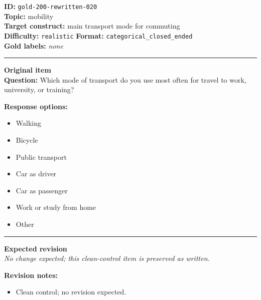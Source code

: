 \documentclass[10pt,a4paper]{article}
\newcommand{\sectionline}{\vspace{0.15em}\hrule\vspace{0.35em}}
\begin{document}
\begin{tcolorbox}[colframe=CleanGreen,colback=white,colbacktitle=CleanGreen!9,coltitle=black,title={Item 020\hfill Clean control}]
\textbf{ID:} \texttt{gold-200-rewritten-020}\\
\textbf{Topic:} mobility\\
\textbf{Target construct:} main transport mode for commuting\\
\textbf{Difficulty:} \texttt{realistic} \quad \textbf{Format:} \texttt{categorical\_closed\_ended}\\
\textbf{Gold labels:} \textit{none}\\
\sectionline
\textbf{Original item}\\
\textbf{Question:} Which mode of transport do you use most often for travel to work, university, or training?
\par\textbf{Response options:}
\begin{itemize}
\item Walking
\item Bicycle
\item Public transport
\item Car as driver
\item Car as passenger
\item Work or study from home
\item Other
\end{itemize}
\sectionline
\textbf{Expected revision}\\
\textit{No change expected; this clean-control item is preserved as written.}
\par\textbf{Revision notes:}
\begin{itemize}
\item Clean control; no revision expected.
\end{itemize}
\end{tcolorbox}
\end{document}
